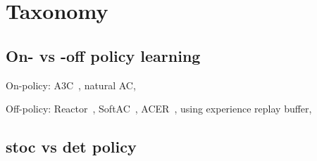 \section{Taxonomy}

\subsection{On- vs -off policy learning}
On-policy:
A3C~\cite{Mnih2016},
natural AC,

Off-policy:
Reactor~\cite{Gruslys2017},
SoftAC~\cite{Haarnoja2017},
ACER~\cite{Wang2016},
using experience replay buffer,

\subsection{stoc vs det policy}
